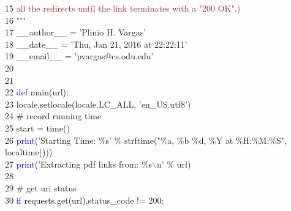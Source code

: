 15	 \hspace*{5mm}     \hspace*{6.25mm}\textcolor{brown}{all the redirects until the link terminates with a "200 OK".)}\\
16	 \hspace*{5mm}\textcolor{brown}{"""}\\
17	 \hspace*{5mm}\_\_author\_\_ = 'Plinio H. Vargas'\\
18	 \hspace*{5mm}\_\_date\_\_ = 'Thu,  \hspace*{2.5mm}Jan 21, 2016 at 22:22:11'\\
19	 \hspace*{5mm}\_\_email\_\_ = 'pvargas@cs.odu.edu'\\
20	 \hspace*{5mm}\\
21	 \hspace*{5mm}\\
22	 \hspace*{5mm}\textcolor{blue}{def} main(url):\\
23	 \hspace*{5mm}    \hspace*{5mm}locale.setlocale(locale.LC\_ALL, 'en\_US.utf8')\\
24	 \hspace*{5mm}    \hspace*{5mm}\# record running time\\
25	 \hspace*{5mm}    \hspace*{5mm}start = time()\\
26	 \hspace*{5mm}    \hspace*{5mm}\textcolor{blue}{print}('Starting Time: \%s' \% strftime("\%a,  \hspace*{2.5mm}\%b \%d, \%Y at \%H:\%M:\%S", localtime()))\\
27	 \hspace*{5mm}    \hspace*{5mm}\textcolor{blue}{print}('Extracting pdf links from: \%s$\backslash$n' \% url)\\
28	 \hspace*{5mm}\\
29	 \hspace*{5mm}    \hspace*{5mm}\# get uri status\\
30	 \hspace*{5mm}    \hspace*{5mm}\textcolor{blue}{if} requests.get(url).status\_code $!$= 200:\\
